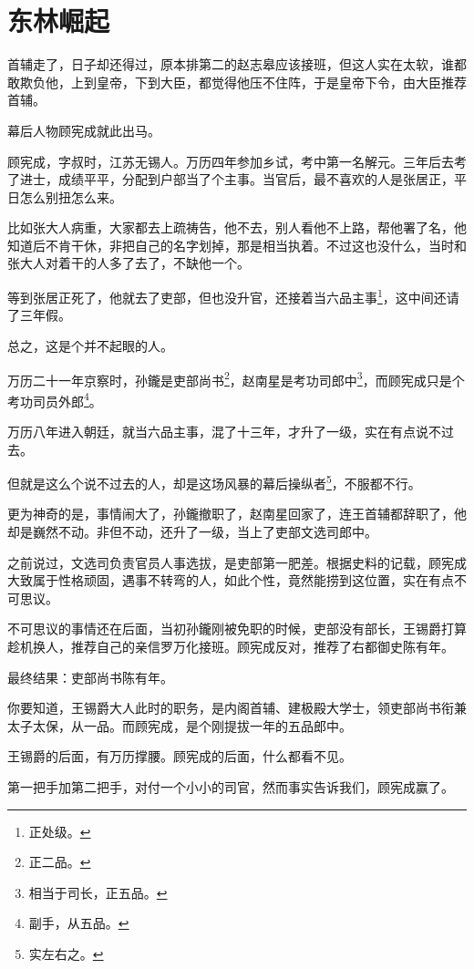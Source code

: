 \section{东林崛起}
\ifnum{}
	\begin{multicols}{\theparacolNo}
		\fi
		首辅走了，日子却还得过，原本排第二的赵志皋应该接班，但这人实在太软，谁都敢欺负他，上到皇帝，下到大臣，都觉得他压不住阵，于是皇帝下令，由大臣推荐首辅。

		幕后人物顾宪成就此出马。

		顾宪成，字叔时，江苏无锡人。万历四年参加乡试，考中第一名解元。三年后去考了进士，成绩平平，分配到户部当了个主事。当官后，最不喜欢的人是张居正，平日怎么别扭怎么来。

		比如张大人病重，大家都去上疏祷告，他不去，别人看他不上路，帮他署了名，他知道后不肯干休，非把自己的名字划掉，那是相当执着。不过这也没什么，当时和张大人对着干的人多了去了，不缺他一个。

		等到张居正死了，他就去了吏部，但也没升官，还接着当六品主事\footnote{正处级。}，这中间还请了三年假。

		总之，这是个并不起眼的人。

		万历二十一年京察时，孙鑨是吏部尚书\footnote{正二品。}，赵南星是考功司郎中\footnote{相当于司长，正五品。}，而顾宪成只是个考功司员外郎\footnote{副手，从五品。}。

		万历八年进入朝廷，就当六品主事，混了十三年，才升了一级，实在有点说不过去。

		但就是这么个说不过去的人，却是这场风暴的幕后操纵者\footnote{实左右之。}，不服都不行。

		更为神奇的是，事情闹大了，孙鑨撤职了，赵南星回家了，连王首辅都辞职了，他却是巍然不动。非但不动，还升了一级，当上了吏部文选司郎中。

		之前说过，文选司负责官员人事选拔，是吏部第一肥差。根据史料的记载，顾宪成大致属于性格顽固，遇事不转弯的人，如此个性，竟然能捞到这位置，实在有点不可思议。

		不可思议的事情还在后面，当初孙鑨刚被免职的时候，吏部没有部长，王锡爵打算趁机换人，推荐自己的亲信罗万化接班。顾宪成反对，推荐了右都御史陈有年。

		最终结果：吏部尚书陈有年。

		你要知道，王锡爵大人此时的职务，是内阁首辅、建极殿大学士，领吏部尚书衔兼太子太保，从一品。而顾宪成，是个刚提拔一年的五品郎中。

		王锡爵的后面，有万历撑腰。顾宪成的后面，什么都看不见。

		第一把手加第二把手，对付一个小小的司官，然而事实告诉我们，顾宪成赢了。


\end{multicols}

